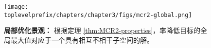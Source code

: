 \documentclass[../../book-main.tex]{subfiles}
\begin{document}




\begin{figure}[t]
	\centering
	\texttt{[image: \\toplevelprefix/chapters/chapter3/figs/mcr2-global.png]}
	\caption{{\bf 局部优化景观：} 根据定理 \ref{thm:MCR2-properties}，率降低目标的全局最大值对应于一个具有相互不相干子空间的解。}
	\label{fig:mcr-global}
\end{figure}
\end{document}

